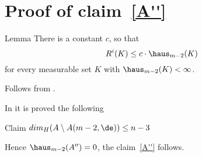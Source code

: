 \section{Proof of claim~\ref{A''}}\label{sec:codim3}

\begin{thm} {Lemma}
There is a constant $c$, so that
$$R^i(K)\le c\cdot \haus_{m-2}(K)$$ for every
measurable set $K$ with $\haus_{m-2}(K)<\infty$.
\end{thm}

Follows from \cite[???]{petrunin-SC}.
\qeds

In \cite{BGP} it is proved the following
\begin{thm}{Claim}
$dim_H(A\setminus A(m-2,\de) )\le n-3$
\end{thm}
Hence $\haus_{m-2}(A'')=0$, the claim~\ref{A''} follows.
